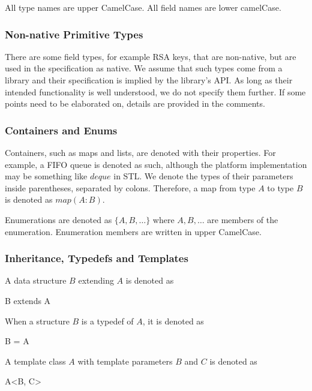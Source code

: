 \documentclass[a4paper,10pt]{article}
\begin{document}
All type names are upper CamelCase. All field names are lower camelCase.

\subsubsection{Non-native Primitive Types}
There are some field types, for example RSA keys, that are non-native, but are used in the specification as native. We assume that such types come from a library and their 
specification is implied by the library's API. As long as their intended functionality is well understood, we do not specify them further. If some points need to be elaborated on, 
details are provided in the comments.

\subsubsection{Containers and Enums}
Containers, such as maps and lists, are denoted with their properties. For example, a FIFO queue is denoted as such, although the platform implementation may be something like 
$deque$ in STL. We denote the types of their parameters inside parentheses, separated by colons. Therefore, a map from type $A$ to type $B$ is denoted as $map(A:B)$.

Enumerations are denoted as $\{ A, B, \dots \}$ where $A, B, \dots$ are members of the enumeration. Enumeration members are written in upper CamelCase.

\subsubsection{Inheritance, Typedefs and Templates}
A data structure $B$ extending $A$ is denoted as

\begin{verbbox}
B extends A
\end{verbbox}
\begin{center}
\theverbbox
\end{center}

When a structure $B$ is a typedef of $A$, it is denoted as

\begin{verbbox}
B = A
\end{verbbox}
\begin{center}
\theverbbox
\end{center}

A template class $A$ with template parameters $B$ and $C$ is denoted as

\begin{verbbox}
A<B, C>
\end{verbbox}
\begin{center}
\theverbbox
\end{center}
\end{document}
